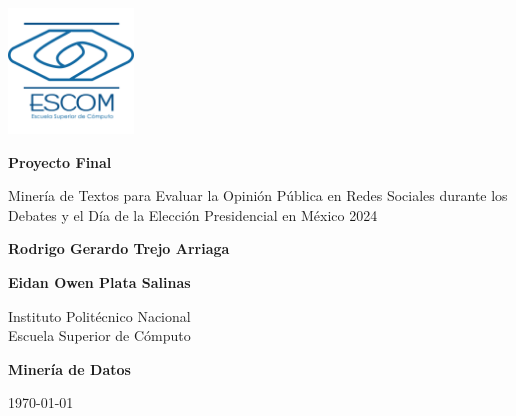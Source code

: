 \documentclass[10pt, a4paper]{article}
\title{\mytitle}
\author{\myauthor\hspace{1em}\\\contact\\Instituto Politécnico Nacional -- ESCOM\hspace{0.5em}\\\hspace{0.5em}\mymodule}
\date{}
\begin{document}
	\begin{titlepage}
		\centering
		\includegraphics[width=0.25\textwidth]{images/logo.png}\par\vspace{2.5cm} %
		{\huge \textbf{Proyecto Final}}\par\vspace{2cm}
		{\LARGE Minería de Textos para Evaluar la Opinión Pública en Redes Sociales durante los Debates y el Día de la Elección Presidencial en México 2024\\}\par\vspace{2cm}
		{\large \textbf{Rodrigo Gerardo Trejo Arriaga}}\par\vspace{0.2cm}
		{\large \textbf{Eidan Owen Plata Salinas}}\par\vspace{0.5cm}
		{\large Instituto Politécnico Nacional\\ Escuela Superior de Cómputo}\par\vspace{1cm}
		{\large \textbf{Minería de Datos}}\par\vspace{2cm}
		{\large \today}\par
	\end{titlepage}
	
	\newpage
	\tableofcontents
	\newpage
	
	
	\newpage
	\maketitle
	\thispagestyle{fancy}
	\begin{abstract}
        Los autores proponen un análisis de los comentarios en YouTube y X durante las elecciones presidenciales de México 2024, enfocándose en el sentimiento y los temas clave relacionados con los candidatos Claudia Sheinbaum, Xóchitl Gálvez y Jorge Álvarez Maynez. Utilizando técnicas de minería de textos y múltiples algoritmos de aprendizaje automático, se examinan las opiniones y reacciones del electorado durante los debates y el día de la elección. El estudio busca identificar patrones de sentimiento, tópicos principales y diferencias entre audiencias en distintas plataformas y canales. 
	\end{abstract}
    
\end{document}
